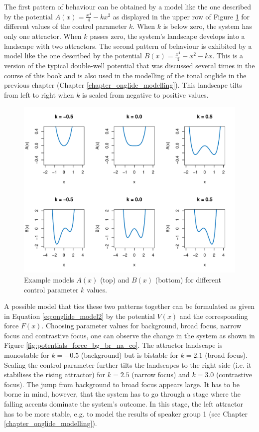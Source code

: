 The first pattern of behaviour can be obtained by a model like the one described by the potential $A(x) = \frac{x^4}{4} - kx^2$ as displayed in the upper row of Figure \ref{fig:example_models} for different values of the control parameter $k$. When $k$ is below zero, the system has only one attractor. When $k$ passes zero, the system's landscape develops into a landscape with two attractors. The second pattern of behaviour is exhibited by a model like the one described by the potential $B(x) = \frac{x^4}{4} - x^2 - kx$. This is a version of the typical double-well potential that was discussed several times in the course of this book and is also used in the modelling of the tonal onglide in the previous chapter (Chapter \ref{chapter_onglide_modelling}). This landscape tilts from left to right when $k$ is scaled from negative to positive values.

\begin{figure}
\includegraphics[width=\textwidth]{figures/ch7/example_models.pdf}
\caption[Example models $A(x)$ and $B(x)$.]{Example models $A(x)$ (top) and $B(x)$ (bottom) for different control parameter $k$ values.}
\label{fig:example_models}
\end{figure}

\newpage
A possible model that ties these two patterns together can be formulated as given in Equation \ref{eq:onglide_model2} by the potential $V(x)$ and the corresponding force $F(x)$. Choosing parameter values for background, broad focus, narrow focus and contrastive focus, one can observe the change in the system as shown in Figure \ref{fig:potentials_force_bg_br_na_co}. The attractor landscape is monostable for $k = -0.5$ (background) but is bistable for $k = 2.1$ (broad focus). Scaling the control parameter further tilts the landscapes to the right side (i.e. it stabilises the rising attractor) for $k = 2.5$ (narrow focus) and $k = 3.0$ (contrastive focus). The jump from background to broad focus appears large. It has to be borne in mind, however, that the system has to go through a stage where the falling accents dominate the system's outcome. In this stage, the left attractor has to be more stable, e.g. to model the results of speaker group 1 (see Chapter \ref{chapter_onglide_modelling}).

